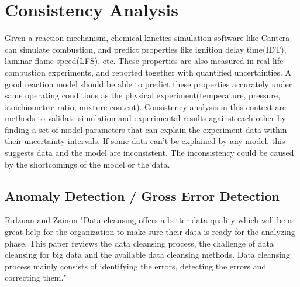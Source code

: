 \section{Consistency Analysis}
Given a reaction mechanism, chemical kinetics simulation software like Cantera\cite{cantera} can simulate combustion, and predict properties like ignition delay time(IDT), laminar flame speed(LFS), etc. These properties are also measured in real life combustion experiments, and reported together with quantified uncertainties. A good reaction model should be able to predict these properties accurately under same operating conditions as the physical experiment(temperature, pressure, stoichiometric ratio, mixture content). Consistency analysis in this context are methods to validate simulation and experimental results against each other by finding a set of model parameters that can explain the experiment data within their uncertainty intervals. If some data can't be explained by any model, this suggests data and the model are inconsistent. The inconsistency could be caused by the shortcomings of the model or the data.   




\subsection{Anomaly Detection / Gross Error Detection}

Ridzuan and Zainon \cite{ridzuan_review_2019}"Data cleansing offers a better data quality which will be a great help for the organization to make sure their data is ready for the analyzing phase. This paper reviews the data cleansing process, the challenge of data cleansing for big data and the available data cleansing methods. Data cleansing process mainly consists of identifying the errors, detecting the errors and correcting them."

